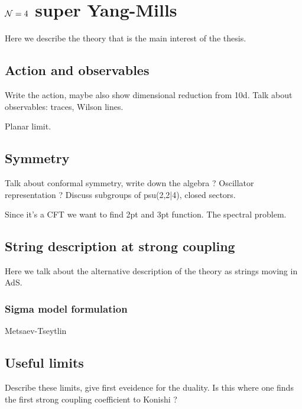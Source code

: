 
\section{$\mathcal{N}=4$ super Yang-Mills}

Here we describe the theory that is the main interest of the thesis.

\subsection{Action and observables}

Write the action, maybe also show dimensional reduction from 10d. Talk about observables: traces, Wilson lines. 

Planar limit.

\subsection{Symmetry}

Talk about conformal symmetry, write down the algebra ? Oscillator representation ? Discuss subgroups of psu(2,2|4), closed sectors. 

Since it's a CFT we want to find 2pt and 3pt function. The spectral problem.



\subsection{String description at strong coupling}

Here we talk about the alternative description of the theory as strings moving in AdS.

\subsubsection{Sigma model formulation}

Metsaev-Tseytlin

\subsection{Useful limits}

Describe these limits, give first eveidence for the duality. Is this where one finds the first strong coupling coefficient to Konishi ?